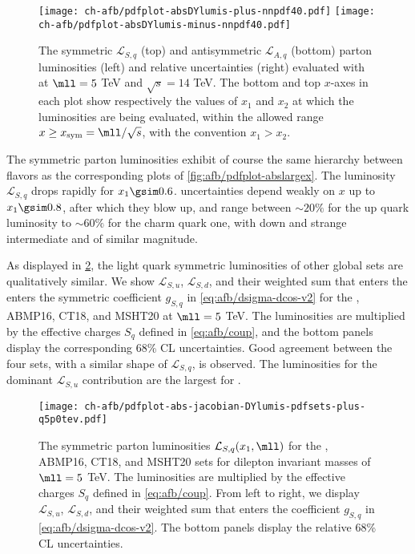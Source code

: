 \begin{figure}[!t]
 \centering
 \texttt{[image: ch-afb/pdfplot-absDYlumis-plus-nnpdf40.pdf]}
 \texttt{[image: ch-afb/pdfplot-absDYlumis-minus-nnpdf40.pdf]}
 \caption{The symmetric $\mathcal{L}_{S,q}$ (top)
   and antisymmetric $\mathcal{L}_{A,q}$ (bottom)
   parton
   luminosities (left) and relative uncertainties (right) evaluated with
    \nnlo at $\mll=5$ TeV and $\sqrt{s}=14$ TeV.
The bottom  and top $x$-axes in each plot show respectively the values
of $x_1$ and $x_2$  at which the
luminosities are being evaluated, within the allowed range
$x \ge x_{\rm sym}=\mll/\sqrt{s}$, with the convention $x_1>x_2$.}    
 \label{fig:afb/pdfplot-absDYlumis-plus-nnpdf40}
\end{figure}

The symmetric parton luminosities exhibit of course the same hierarchy
between flavors
as the corresponding \pdf plots of \cref{fig:afb/pdfplot-abslargex}. 
%
The luminosity $\mathcal{L}_{S,q}$  drops rapidly for
$x_1\gsim 0.6$. \pdf  uncertainties  depend weakly on  $x$
up to $x_1\gsim 0.8$, after which they blow up, and range between $\sim 20\%$
for the up quark luminosity to $\sim 60\%$ for the charm quark one,
with down and strange intermediate and of similar magnitude.

As displayed in \cref{fig:afb/mll_dep_lumi_plus}, the light quark symmetric luminosities of other global \pdf sets
are qualitatively similar.
%
We show $\mathcal{L}_{S,u}$,  $\mathcal{L}_{S,d}$,
and their weighted sum that enters the  enters the
symmetric coefficient $g_{S,q}$ in \cref{eq:afb/dsigma-dcos-v2}
for the , ABMP16,
CT18, and MSHT20 at $\mll=5$ TeV.
%
The luminosities are multiplied by the effective charges
$S_q$ defined in \cref{eq:afb/coup},
and the bottom panels display the corresponding 68\% CL \pdf uncertainties.
%
Good agreement between the four sets, with a similar shape
of $\mathcal{L}_{S,q}$, is observed.
%
The \pdf luminosities for the dominant $\mathcal{L}_{S,u}$ contribution are the largest for .

\begin{figure}[!t]
 \centering
 \texttt{[image: ch-afb/pdfplot-abs-jacobian-DYlumis-pdfsets-plus-q5p0tev.pdf]}
  \caption{The symmetric 
   parton luminosities $\mathcal{L}_{S,q}(x_1,\mll)$ for the , ABMP16,
   CT18, and MSHT20 \nnlo \pdf sets for dilepton
   invariant masses of $\mll=5$ TeV.
   The luminosities are multiplied by the effective charges
   $S_q$ defined in \cref{eq:afb/coup}.
   From left to right, we display $\mathcal{L}_{S,u}$,  $\mathcal{L}_{S,d}$,
   and their weighted sum that enters the  coefficient $g_{S,q}$ in \cref{eq:afb/dsigma-dcos-v2}.
   The bottom panels display the relative 68\% CL \pdf uncertainties.
    }    
 \label{fig:afb/mll_dep_lumi_plus}
\end{figure}

